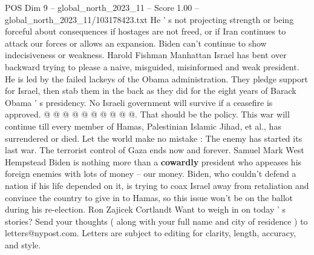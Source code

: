 \begin{textsample}{POS Dim 9 – global\_north\_2023\_11 – Score 1.00 – global\_north\_2023\_11/103178423.txt}
He ' s not projecting strength or being forceful about consequences if hostages are not freed, or if Iran continues to attack our forces or allows an expansion.
Biden can't continue to show indecisiveness or weakness.
Harold Fishman Manhattan Israel has bent over backward trying to please a naive, misguided, misinformed and weak president.
He is led by the failed lackeys of the Obama administration.
They pledge support for Israel, then stab them in the back as they did for the eight years of Barack Obama ' s presidency.
No Israeli government will survive if a ceasefire is approved. @ @ @ @ @ @ @ @ @ @.
That should be the policy.
This war will continue till every member of Hamas, Palestinian Islamic Jihad, et al., has surrendered or died.
Let the world make no mistake : The enemy has started its last war.
The terrorist control of Gaza ends now and forever.
Samuel Mark West Hempstead Biden is nothing more than a \textbf{cowardly} president who appeases his foreign enemies with lots of money -- our money.
Biden, who couldn't defend a nation if his life depended on it, is trying to coax Israel away from retaliation and convince the country to give in to Hamas, so this issue won't be on the ballot during his re-election.
Ron Zajicek Cortlandt Want to weigh in on today ' s stories?
Send your thoughts ( along with your full name and city of residence ) to letters@nypost.com.
Letters are subject to editing for clarity, length, accuracy, and style.

\end{textsample}
